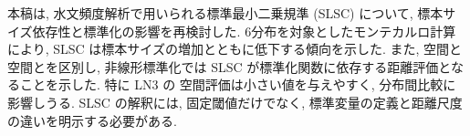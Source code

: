 本稿は, 水文頻度解析で用いられる標準最小二乗規準 (SLSC) について, 標本サイズ依存性と標準化の影響を再検討した.
6分布を対象としたモンテカルロ計算により, SLSC は標本サイズの増加とともに低下する傾向を示した.
また,  \Xsp 空間と \Ssp 空間とを区別し, 非線形標準化では SLSC が標準化関数に依存する距離評価となることを示した.
特に LN3 の \Ssp 空間評価は小さい値を与えやすく, 分布間比較に影響しうる.
SLSC の解釈には, 固定閾値だけでなく, 標準変量の定義と距離尺度の違いを明示する必要がある.
